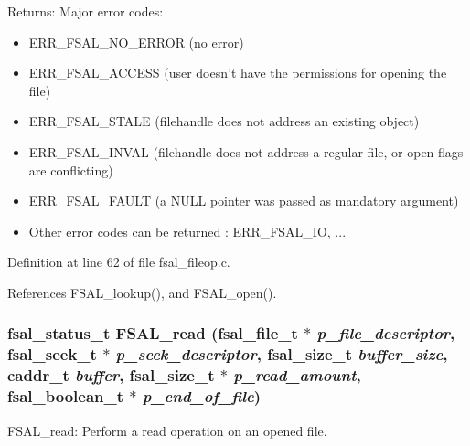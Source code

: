 \begin{Desc}
\item[Returns:]Major error codes:\begin{itemize}
\item ERR\_\-FSAL\_\-NO\_\-ERROR (no error)\item ERR\_\-FSAL\_\-ACCESS (user doesn't have the permissions for opening the file)\item ERR\_\-FSAL\_\-STALE (filehandle does not address an existing object)\item ERR\_\-FSAL\_\-INVAL (filehandle does not address a regular file, or open flags are conflicting)\item ERR\_\-FSAL\_\-FAULT (a NULL pointer was passed as mandatory argument)\item Other error codes can be returned : ERR\_\-FSAL\_\-IO, ... \end{itemize}
\end{Desc}


Definition at line 62 of file fsal\_\-fileop.c.

References FSAL\_\-lookup(), and FSAL\_\-open().
\subsubsection[{FSAL\_\-read}]{\setlength{\rightskip}{0pt plus 5cm}fsal\_\-status\_\-t FSAL\_\-read (fsal\_\-file\_\-t $\ast$ {\em p\_\-file\_\-descriptor}, \/  fsal\_\-seek\_\-t $\ast$ {\em p\_\-seek\_\-descriptor}, \/  fsal\_\-size\_\-t {\em buffer\_\-size}, \/  caddr\_\-t {\em buffer}, \/  fsal\_\-size\_\-t $\ast$ {\em p\_\-read\_\-amount}, \/  fsal\_\-boolean\_\-t $\ast$ {\em p\_\-end\_\-of\_\-file})}\label{fsal__fileop_8c_8351d44165cd86bc17eb3240461e6df2}


FSAL\_\-read: Perform a read operation on an opened file.

